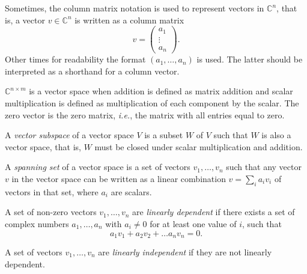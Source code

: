 Sometimes, the column matrix notation is used to represent vectors in $\mathbb{C}^{n}$, that is, a vector $v \in \mathbb{C}^{n}$ is written as a column matrix $$v = \begin{pmatrix} a_1 \\ \vdots \\ a_n \end{pmatrix}.$$ Other times for readability the format $(a_1, \ldots , a_n)$ is used. The latter should be interpreted as a shorthand for a column vector.

$\mathbb{C}^{n \times m}$ is a vector space when addition is defined as matrix addition and scalar multiplication is defined as multiplication of each component by the scalar. The zero vector is the zero matrix, \textit{i.e.}, the matrix with all entries equal to zero.



\begin{definition}
A \emph{vector subspace} of a vector space $V$ is a subset $W$ of $V$ such that $W$ is also a vector space, that is, $W$ must be closed under scalar multiplication and addition.
\end{definition}

\begin{definition}
  A \emph{spanning set} of a vector space is a set of vectors $v_{1}, \ldots, v_{n}$ such that any vector $v$ in the vector space can be written as a linear combination $v = \sum_{i} a_{i} v_{i}$ of vectors in that set, where $a_{i}$ are scalars.
\end{definition}

\begin{definition}
A set of non-zero vectors $v_1, \ldots, v_n$ are \emph{linearly dependent} if there exists a set of complex numbers $a_1, \ldots , a_n$ with $a_i \neq 0$ for at least one value of $i$, such that
\begin{equation*}
  a_1 v_1 + a_2 v_2 +\ldots a_n v_n = 0.
\end{equation*}
\end{definition}

\begin{definition}
A set of vectors $v_1, \ldots, v_n$ are \emph{linearly independent} if they are not linearly dependent.
\end{definition}


